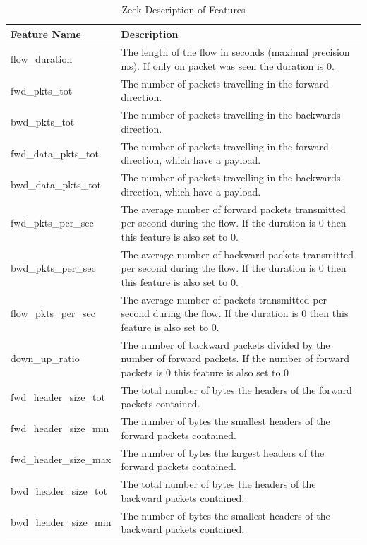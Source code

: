 \documentclass[11pt]{article}
\begin{document}
\begin{table}
  \centering
  \caption{Zeek Description of Features}
  \label{tab:FeatureTab}
  \begin{tabular}{|l|p{12cm}|}
    \hline
    Feature Name & Description \\
    \hline\hline
    flow\_duration & The length of the flow in seconds (maximal precision ms). If only on packet was seen the duration is 0. \\
    \hline
    fwd\_pkts\_tot & The number of packets travelling in the forward direction. \\
    \hline
    bwd\_pkts\_tot & The number of packets travelling in the backwards direction. \\
    \hline
    fwd\_data\_pkts\_tot & The number of packets travelling in the forward direction, which have a payload. \\
    \hline
    bwd\_data\_pkts\_tot & The number of packets travelling in the backwards direction, which have a payload. \\
    \hline
    fwd\_pkts\_per\_sec & The average number of forward packets transmitted per second during the flow. If the duration is 0 then this feature is also set to 0. \\
    \hline
    bwd\_pkts\_per\_sec & The average number of backward packets transmitted per second during the flow. If the duration is 0 then this feature is also set to 0. \\
    \hline
    flow\_pkts\_per\_sec & The average number of  packets transmitted per second during the flow. If the duration is 0 then this feature is also set to 0. \\
    \hline
    down\_up\_ratio & The number of backward packets divided by the number of forward packets. If the number of forward packets is 0 this feature is also set to 0 \\
    \hline
    fwd\_header\_size\_tot & The total number of bytes the headers of the forward packets contained. \\
    \hline
    fwd\_header\_size\_min & The number of bytes the smallest headers of the forward packets contained. \\
    \hline
    fwd\_header\_size\_max & The number of bytes the largest headers of the forward packets contained. \\
    \hline
    bwd\_header\_size\_tot & The total number of bytes the headers of the backward packets contained. \\
    \hline
    bwd\_header\_size\_min & The number of bytes the smallest headers of the backward packets contained. \\

\end{tabular}
\end{table}
\end{document}
